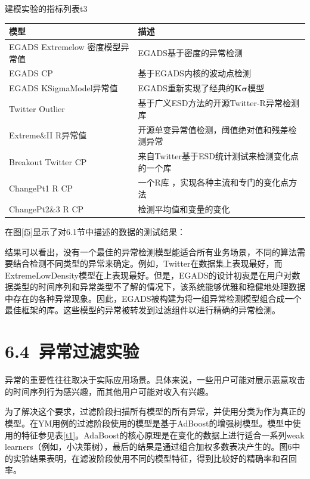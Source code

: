 \documentclass[a4paper,AutoFakeBold,oneside,12pt]{book}
\begin{document}
\begin{bupttable}{建模实验的指标列表}{t3}
    \begin{tabular}{l|l}
		\hline \textbf{模型} & \textbf{描述} \\
		\hline EGADS Extremelow 密度模型异常值 & EGADS基于密度的异常检测 \\
		\hline EGADS CP & 基于EGADS内核的波动点检测  \\
		\hline EGADS KSigmaModel异常值 & EGADS重新实现了经典的$\bm{K\sigma}$模型  \\
		\hline Twitter Outlier & 基于广义ESD方法的开源Twitter-R异常检测库\\
		\hline Extreme\&II R异常值 & 开源单变异常值检测，阈值绝对值和残差检测异常  \\
		\hline Breakout Twitter CP & 来自Twitter基于ESD统计测试来检测变化点的一个库  \\
		\hline ChangePt1 R CP & 一个R库 ，实现各种主流和专门的变化点方法\\ 
		\hline ChangePt2\&3 R CP & 检测平均值和变量的变化  \\
		\hline
    \end{tabular}
\end{bupttable}

在图\ref{f5}显示了对6.1节中描述的数据的测试结果：


结果可以看出，没有一个最佳的异常检测模型能适合所有业务场景，不同的算法需要结合检测不同类型的异常来确定。例如，Twitter在数据集上表现最好，而ExtremeLowDensity模型在上表现最好。但是，EGADS的设计初衷是在用户对数据类型的时间序列和异常类型不了解的情况下，该系统能够优雅和稳健地处理数据中存在的各种异常现象。因此，EGADS被构建为将一组异常检测模型组合成一个最佳框架的库。这些模型的异常被转发到过滤组件以进行精确的异常检测。

\section*{6.4\ 异常过滤实验}

异常的重要性往往取决于实际应用场景。具体来说，一些用户可能对展示恶意攻击的时间序列行为感兴趣，而其他用户可能对收入有兴趣。

为了解决这个要求，过滤阶段扫描所有模型的所有异常，并使用分类为作为真正的模型。在YM用例的过滤阶段使用的模型是基于AdBoost的增强树模型。模型中使用的特征参见表\ref{t1}。AdaBoost的核心原理是在变化的数据上进行适合一系列weak learners（例如，小决策树），最后的结果是通过组合加权多数表决产生的。图6中的实验结果表明，在滤波阶段使用不同的模型特征，得到比较好的精确率和召回率。
\end{document}
